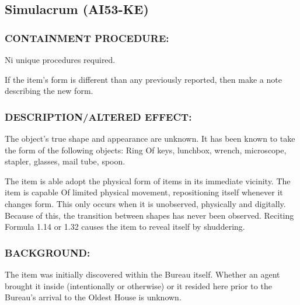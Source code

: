 \subsection*{Simulacrum (AI53-KE)}
\subsubsection*{CONTAINMENT PROCEDURE:}
\par Ni unique procedures required.
\par If the item's form is different than any
previously reported, then make a note
describing the new form.
\subsubsection*{DESCRIPTION/ALTERED EFFECT:}
\par The object's true shape and appearance
are unknown. It has been known to take the form of the following
objects: Ring Of keys, lunchbox, wrench, microscope, stapler,
glasses, mail tube, spoon.
\par The item is able adopt the physical form of items in its immediate
vicinity. The item is capable Of limited physical movement,
repositioning itself whenever it changes form. This only occurs
when it is unobserved, physically and digitally. Because of this,
the transition between shapes has never been observed. Reciting
Formula 1.14 or 1.32 causes the item to reveal itself by shuddering.
\subsubsection*{BACKGROUND:}
\par The item was initially discovered within the Bureau itself. Whether
an agent brought it inside (intentionally or otherwise) or it resided
here prior to the Bureau's arrival to the Oldest House is unknown.
